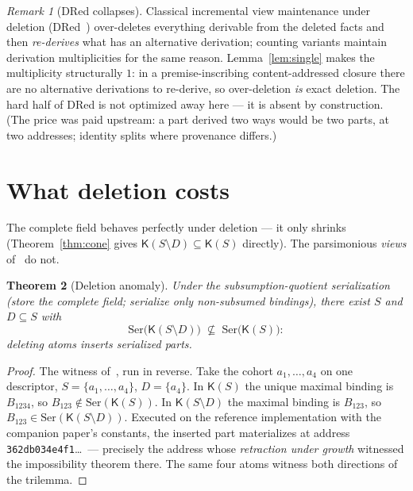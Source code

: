 \documentclass[11pt]{article}
\newtheorem{theorem}{Theorem}
\theoremstyle{definition}
\theoremstyle{remark}
\newtheorem{remark}[theorem]{Remark}
\newcommand{\K}{\mathsf{K}}
\newcommand{\diffop}{\setminus}
\newcommand{\sub}{\subseteq}
\begin{document}
\begin{remark}[DRed collapses]\label{rem:dred}
Classical incremental view maintenance under deletion (DRed~\cite{GuptaMS93}) over-deletes everything derivable from the deleted facts and then \emph{re-derives} what has an alternative derivation; counting variants maintain derivation multiplicities for the same reason. Lemma~\ref{lem:single} makes the multiplicity structurally $1$: in a premise-inscribing content-addressed closure there are no alternative derivations to re-derive, so over-deletion \emph{is} exact deletion. The hard half of DRed is not optimized away here --- it is absent by construction. (The price was paid upstream: a part derived two ways would be two parts, at two addresses; identity splits where provenance differs.)
\end{remark}

\section{What deletion costs}\label{sec:anomaly}

The complete field behaves perfectly under deletion --- it only shrinks (Theorem~\ref{thm:cone} gives $\K(S \diffop D) \sub \K(S)$ directly). The parsimonious \emph{views} of~\cite{growth} do not.

\begin{theorem}[Deletion anomaly]\label{thm:anomaly}
Under the subsumption-quotient serialization (store the complete field; serialize only non-subsumed bindings), there exist $S$ and $D \sub S$ with
\[ \mathrm{Ser}\big(\K(S \diffop D)\big) \;\not\sub\; \mathrm{Ser}\big(\K(S)\big): \]
deleting atoms inserts serialized parts.
\end{theorem}

\begin{proof}
The witness of~\cite{growth}, run in reverse. Take the cohort $a_1,\dots,a_4$ on one descriptor, $S = \{a_1,\dots,a_4\}$, $D = \{a_4\}$. In $\K(S)$ the unique maximal binding is $B_{1234}$, so $B_{123} \notin \mathrm{Ser}(\K(S))$. In $\K(S \diffop D)$ the maximal binding is $B_{123}$, so $B_{123} \in \mathrm{Ser}(\K(S \diffop D))$. Executed on the reference implementation with the companion paper's constants, the inserted part materializes at address \texttt{362db034e4f1}\ldots\ --- precisely the address whose \emph{retraction under growth} witnessed the impossibility theorem there. The same four atoms witness both directions of the trilemma.
\end{proof}
\end{document}
